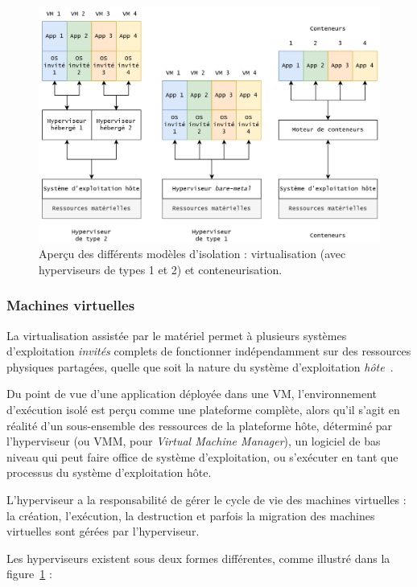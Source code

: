\begin{figure}[!ht]
    \centering
	\includegraphics[width=\textwidth]{2_Chapitre2/figures/virtualization.png}
	\caption{Aperçu des différents modèles d'isolation : virtualisation (avec hyperviseurs de types 1 et 2) et conteneurisation.}
	\label{figure:context-virtualization}
\end{figure}

\subsubsection{Machines virtuelles}

La virtualisation assistée par le matériel permet à plusieurs systèmes d'exploitation \textit{invités} complets de fonctionner indépendamment sur des ressources physiques partagées, quelle que soit la nature du système d'exploitation \textit{hôte}~\cite{kivityKvmLinuxVirtual}.

Du point de vue d'une application déployée dans une \gls{VM}, l'environnement d'exécution isolé est perçu comme une plateforme complète, alors qu'il s'agit en réalité d'un sous-ensemble des ressources de la plateforme hôte, déterminé par l'hyperviseur (ou \gls{VMM}, pour \textit{Virtual Machine Manager}), un logiciel de bas niveau qui peut faire office de système d'exploitation, ou s'exécuter en tant que processus du système d'exploitation hôte.

L'hyperviseur a la responsabilité de gérer le cycle de vie des machines virtuelles : la création, l'exécution, la destruction et parfois la migration des machines virtuelles sont gérées par l'hyperviseur.

Les hyperviseurs existent sous deux formes différentes, comme illustré dans la figure~\ref{figure:context-virtualization} :

